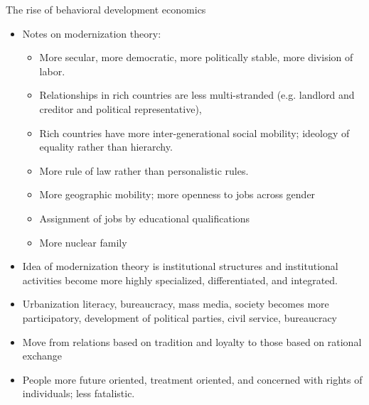 \documentclass[aspectratio=169, 10pt, handout]{beamer}
\begin{document}
\begin{frame}{The rise of behavioral development economics}
{\begin{itemize}
    \item Notes on modernization theory:
    \begin{itemize}
    
        \scriptsize
    
        \item More secular, more democratic, more politically stable, more division of labor.
        \item Relationships in rich countries are less multi-stranded (e.g. landlord and creditor and political representative), 
        \item Rich countries have more inter-generational social mobility; ideology of equality rather than hierarchy.
        \item More rule of law rather than personalistic rules.
        \item More geographic mobility; more openness to jobs across gender

        \item Assignment of jobs by educational qualifications
        \item More nuclear family
    \end{itemize}

    \item Idea of modernization theory is institutional structures and institutional activities become more highly specialized, differentiated, and integrated.

    \item Urbanization literacy, bureaucracy, mass media, society becomes more participatory, development of political parties, civil service, bureaucracy

    \item Move from relations based on tradition and loyalty to those based on rational exchange

    \item People more future oriented, treatment oriented, and concerned with rights of individuals; less fatalistic.

    \end{itemize}

}

\end{frame}
\end{document}
